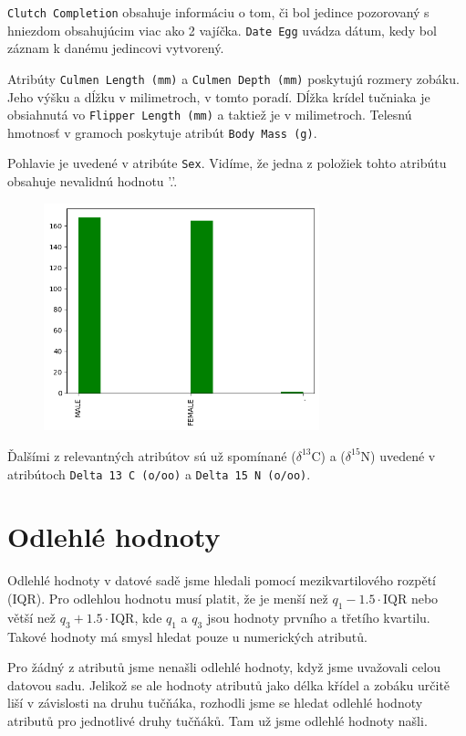 \documentclass[10pt,xcolor=pdflatex,dvipsnames,table,oneside]{book}
\begin{document}
\texttt{Clutch Completion} obsahuje informáciu o tom, či bol jedince pozorovaný s hniezdom obsahujúcim viac ako 2 vajíčka. \texttt{Date Egg} uvádza dátum, kedy bol záznam k danému jedincovi vytvorený.

Atribúty \texttt{Culmen Length (mm)} a  \texttt{Culmen Depth (mm)} poskytujú rozmery zobáku. Jeho   výšku a dĺžku v milimetroch, v tomto poradí.
Dĺžka krídel tučniaka je obsiahnutá vo \texttt{Flipper Length (mm)} a taktiež je v milimetroch. Telesnú hmotnosť v gramoch poskytuje atribút \texttt{Body Mass (g)}.



\newpage
Pohlavie je uvedené v atribúte \texttt{Sex}. Vidíme, že jedna z položiek tohto atribútu obsahuje nevalidnú hodnotu '.'.

\begin{figure}[t]
  \includegraphics[width=8cm]{img/the_thing.png}
  \centering
\end{figure}

Ďalšími z relevantných atribútov sú už spomínané ($\delta^{13}$C) a ($\delta^{15}$N) uvedené v atribútoch \texttt{Delta 13 C (o/oo)} a \texttt{Delta 15 N (o/oo)}.

\section*{Odlehlé hodnoty}
Odlehlé hodnoty v datové sadě jsme hledali pomocí mezikvartilového rozpětí (IQR). Pro odlehlou hodnotu musí platit, že je menší než $q_1 - 1.5 \cdot \textrm{IQR}$ nebo větší než $q_3 + 1.5 \cdot \textrm{IQR}$, kde $q_1$ a $q_3$ jsou hodnoty prvního a třetího kvartilu. Takové hodnoty má smysl hledat pouze u numerických atributů.

Pro žádný z atributů jsme nenašli odlehlé hodnoty, když jsme uvažovali celou datovou sadu. Jelikož se ale hodnoty atributů jako délka křídel a zobáku určitě liší v závislosti na druhu tučňáka, rozhodli jsme se hledat odlehlé hodnoty atributů pro jednotlivé druhy tučňáků.
Tam už jsme odlehlé hodnoty našli.
\end{document}
